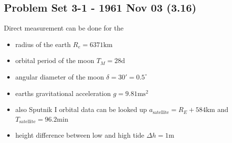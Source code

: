 \documentclass[../main.tex]{subfiles}
\begin{document}
\subsection{Problem Set 3-1 - 1961 Nov 03 (3.16)}
Direct measurement can be done for the
\begin{itemize}
    \item radius of the earth $R_e=6371\text{km}$
    \item orbital period of the moon $T_M=28\text{d}$
    \item angular diameter of the moon $\delta=30'=0.5^\circ$
    \item earths gravitational acceleration $g=9.81\text{ms}^2$
    \item also Sputnik I orbital data can be looked up $a_\text{satellite}=R_E+584\text{km}$ and $T_\text{satellite}=96.2\text{min}$
    \item height difference between low and high tide $\Delta h=1\text{m}$
\end{itemize}
\end{document}
